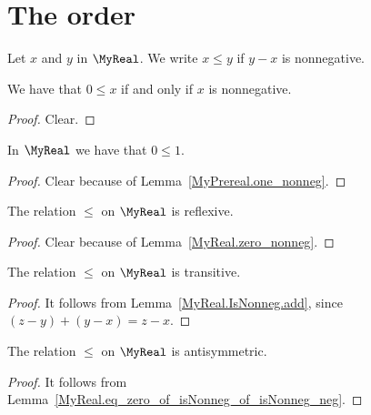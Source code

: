 \section{The order}

\begin{definition}
    \label{MyReal.le}
    \leanok
Let $x$ and $y$ in $\MyReal$. We write $x \leq y$ if $y - x$ is nonnegative.
\end{definition}

\begin{lemma}
    \label{MyReal.zero_le_iff_isNonneg}
    \leanok
    We have that $0 \leq x$ if and only if $x$ is nonnegative.
\end{lemma}
\begin{proof}
    \leanok
    Clear.
\end{proof}

\begin{lemma}
    \label{MyReal.zero_le_one}
    \leanok
    In $\MyReal$ we have that $0 \leq 1$.
\end{lemma}
\begin{proof}
    \leanok
    Clear because of Lemma~\ref{MyPrereal.one_nonneg}.
\end{proof}

\begin{lemma}
    \label{MyReal.le_refl}
    \leanok
    The relation $\leq$ on $\MyReal$ is reflexive.
\end{lemma}
\begin{proof}
    \leanok
    Clear because of Lemma~\ref{MyReal.zero_nonneg}.
\end{proof}

\begin{lemma}
    \label{MyReal.le_trans}
    \leanok
    The relation $\leq$ on $\MyReal$ is transitive.
\end{lemma}
\begin{proof}
    \leanok
    It follows from Lemma~\ref{MyReal.IsNonneg.add}, since $(z - y) + (y - x) = z - x$.
\end{proof}

\begin{lemma}
    \label{MyReal.le_antisymm}
    \leanok
    The relation $\leq$ on $\MyReal$ is antisymmetric.
\end{lemma}
\begin{proof}
    \leanok
    It follows from Lemma~\ref{MyReal.eq_zero_of_isNonneg_of_isNonneg_neg}.
\end{proof}

